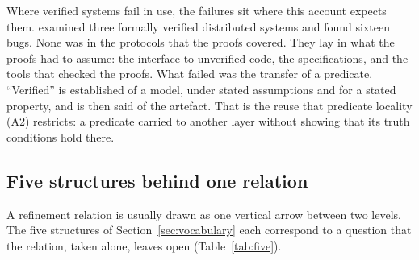 Where verified systems fail in use, the failures sit where this account expects them.
\citet{fonseca2017} examined three formally verified distributed systems and found
sixteen bugs. None was in the protocols that the proofs covered. They lay in what the
proofs had to assume: the interface to unverified code, the specifications, and the
tools that checked the proofs. What failed was the transfer of a predicate. ``Verified'' is
established of a model, under stated assumptions and for a stated property, and is then
said of the artefact. That is the reuse that predicate locality (A2) restricts: a
predicate carried to another layer without showing that its truth conditions hold there.

\subsection{Five structures behind one relation}

A refinement relation is usually drawn as one vertical arrow between two levels. The five
structures of Section~\ref{sec:vocabulary} each correspond to a question that the
relation, taken alone, leaves open (Table~\ref{tab:five}).

